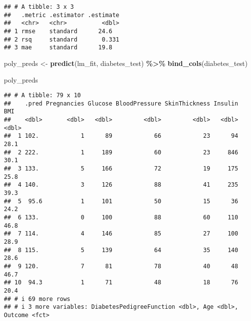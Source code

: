 \documentclass[
]{article}
\newenvironment{Shaded}{\begin{snugshade}}{\end{snugshade}}
\newcommand{\FunctionTok}[1]{\textcolor[rgb]{0.13,0.29,0.53}{\textbf{#1}}}
\newcommand{\NormalTok}[1]{#1}
\newcommand{\OtherTok}[1]{\textcolor[rgb]{0.56,0.35,0.01}{#1}}
\newcommand{\SpecialCharTok}[1]{\textcolor[rgb]{0.81,0.36,0.00}{\textbf{#1}}}
\begin{document}
\begin{verbatim}
## # A tibble: 3 x 3
##   .metric .estimator .estimate
##   <chr>   <chr>          <dbl>
## 1 rmse    standard      24.6  
## 2 rsq     standard       0.331
## 3 mae     standard      19.8
\end{verbatim}

\begin{Shaded}
\begin{Highlighting}[]
\NormalTok{poly\_preds }\OtherTok{\textless{}{-}} \FunctionTok{predict}\NormalTok{(lm\_fit, diabetes\_test) }\SpecialCharTok{\%\textgreater{}\%}
  \FunctionTok{bind\_cols}\NormalTok{(diabetes\_test)}

\NormalTok{poly\_preds}
\end{Highlighting}
\end{Shaded}

\begin{verbatim}
## # A tibble: 79 x 10
##    .pred Pregnancies Glucose BloodPressure SkinThickness Insulin   BMI
##    <dbl>       <dbl>   <dbl>         <dbl>         <dbl>   <dbl> <dbl>
##  1 102.            1      89            66            23      94  28.1
##  2 222.            1     189            60            23     846  30.1
##  3 133.            5     166            72            19     175  25.8
##  4 140.            3     126            88            41     235  39.3
##  5  95.6           1     101            50            15      36  24.2
##  6 133.            0     100            88            60     110  46.8
##  7 114.            4     146            85            27     100  28.9
##  8 115.            5     139            64            35     140  28.6
##  9 120.            7      81            78            40      48  46.7
## 10  94.3           1      71            48            18      76  20.4
## # i 69 more rows
## # i 3 more variables: DiabetesPedigreeFunction <dbl>, Age <dbl>, Outcome <fct>
\end{verbatim}
\end{document}
